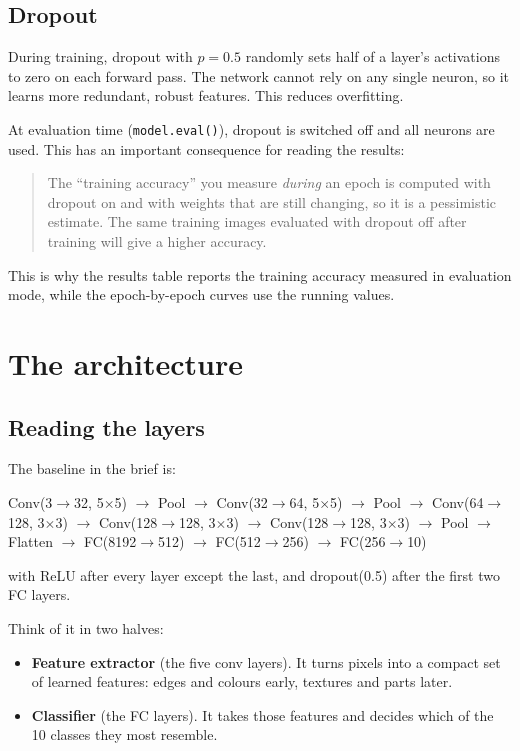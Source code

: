\documentclass[11pt]{article}
\newcommand{\key}[1]{\textbf{#1}}
\begin{document}
\subsection{Dropout}

During training, dropout with $p=0.5$ randomly sets half of a layer's activations to zero on each forward pass. The network cannot rely on any single neuron, so it learns more redundant, robust features. This reduces overfitting.

At evaluation time (\texttt{model.eval()}), dropout is switched off and all neurons are used. This has an important consequence for reading the results:

\begin{quote}
The ``training accuracy'' you measure \emph{during} an epoch is computed with dropout on and with weights that are still changing, so it is a pessimistic estimate. The same training images evaluated with dropout off after training will give a higher accuracy.
\end{quote}

This is why the results table reports the training accuracy measured in evaluation mode, while the epoch-by-epoch curves use the running values.

\section{The architecture}

\subsection{Reading the layers}

The baseline in the brief is:
\begin{center}
\small
Conv(3$\to$32, 5$\times$5) $\to$ Pool $\to$ Conv(32$\to$64, 5$\times$5) $\to$ Pool $\to$ Conv(64$\to$128, 3$\times$3) $\to$ Conv(128$\to$128, 3$\times$3) $\to$ Conv(128$\to$128, 3$\times$3) $\to$ Pool $\to$ Flatten $\to$ FC(8192$\to$512) $\to$ FC(512$\to$256) $\to$ FC(256$\to$10)
\end{center}
with ReLU after every layer except the last, and dropout(0.5) after the first two FC layers.

Think of it in two halves:
\begin{itemize}[noitemsep]
\item \key{Feature extractor} (the five conv layers). It turns pixels into a compact set of learned features: edges and colours early, textures and parts later.
\item \key{Classifier} (the FC layers). It takes those features and decides which of the 10 classes they most resemble.
\end{itemize}
\end{document}
